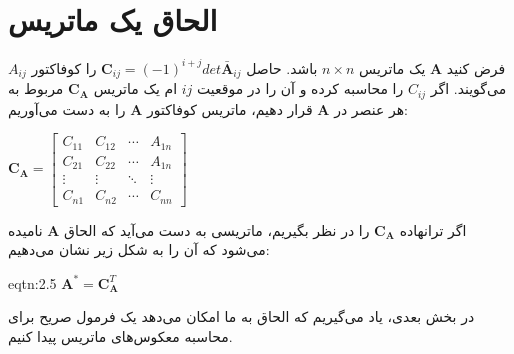 \section{\textbf{الحاق یک ماتریس}}
\label{sec:2.6}
{
    \Large
    \begin{spacing}{1.5}
        فرض کنید $\textbf{A}$ یک ماتریس $n\times n$ باشد. حاصل $\textbf{C}_{ij}=(-1)^{i+j}det\bar{\textbf{A}}_{ij}$ را کوفاکتور $A_{ij}$ می‌گویند.
        اگر $C_{ij}$ را محاسبه کرده و آن را در موقعیت $ij$ ام یک ماتریس $\textbf{C}_{\textbf{A}}$ مربوط به هر عنصر در $\textbf{A}$ قرار دهیم، ماتریس کوفاکتور $\textbf{A}$ را به دست می‌آوریم:

        \begin{center}
            $\textbf{C}_{\textbf{A}}=\begin{bmatrix}
                                         C_{11} & C_{12} & \cdots & A_{1n} \\
                                         C_{21} & C_{22} & \cdots & A_{1n} \\
                                         \vdots & \vdots & \ddots & \vdots \\
                                         C_{n1} & C_{n2} & \cdots & C_{nn}
            \end{bmatrix}$
        \end{center}

        اگر ترانهاده $\textbf{C}_{\textbf{A}}$ را در نظر بگیریم، ماتریسی به دست می‌آید که الحاق $\textbf{A}$ نامیده می‌شود که آن را به شکل زیر نشان می‌دهیم:

        \begin{eqtn}{eqtn:2.5}
            \centering
            $\textbf{A}^{*}=\textbf{C}^{T}_{\textbf{A}}$
        \end{eqtn}

        در بخش بعدی، یاد می‌گیریم که الحاق به ما امکان می‌دهد یک فرمول صریح برای محاسبه معکوس‌های ماتریس پیدا کنیم.
    \end{spacing}
}


